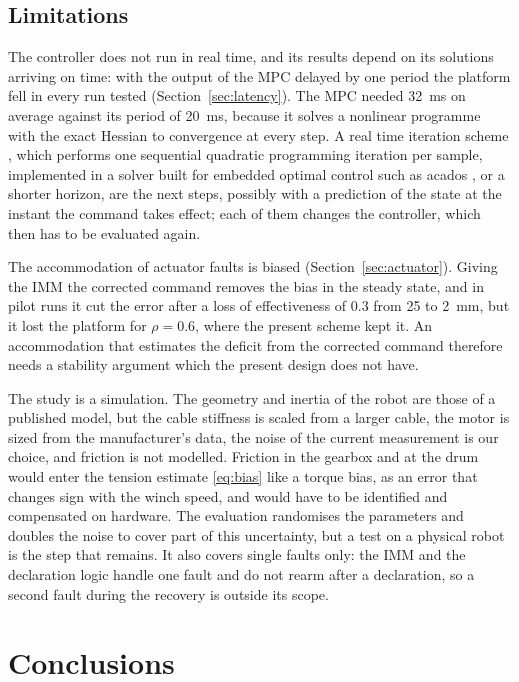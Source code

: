 \documentclass[a4paper,fleqn]{cas-dc}
\begin{document}
\subsection{Limitations}\label{sec:limits}

The controller does not run in real time, and its results depend on its solutions arriving on time: with the output of the MPC delayed by one period the platform fell in every run tested (Section~\ref{sec:latency}). The MPC needed 32~ms on average against its period of 20~ms, because it solves a nonlinear programme with the exact Hessian to convergence at every step. A real time iteration scheme \citep{diehl2005rti}, which performs one sequential quadratic programming iteration per sample, implemented in a solver built for embedded optimal control such as acados \citep{verschueren2022acados}, or a shorter horizon, are the next steps, possibly with a prediction of the state at the instant the command takes effect; each of them changes the controller, which then has to be evaluated again.

The accommodation of actuator faults is biased (Section~\ref{sec:actuator}). Giving the IMM the corrected command removes the bias in the steady state, and in pilot runs it cut the error after a loss of effectiveness of 0.3 from 25 to 2~mm, but it lost the platform for $\rho=0.6$, where the present scheme kept it. An accommodation that estimates the deficit from the corrected command therefore needs a stability argument which the present design does not have.

The study is a simulation. The geometry and inertia of the robot are those of a published model, but the cable stiffness is scaled from a larger cable, the motor is sized from the manufacturer's data, the noise of the current measurement is our choice, and friction is not modelled. Friction in the gearbox and at the drum would enter the tension estimate \eqref{eq:bias} like a torque bias, as an error that changes sign with the winch speed, and would have to be identified and compensated on hardware. The evaluation randomises the parameters and doubles the noise to cover part of this uncertainty, but a test on a physical robot is the step that remains. It also covers single faults only: the IMM and the declaration logic handle one fault and do not rearm after a declaration, so a second fault during the recovery is outside its scope.

\section{Conclusions}\label{sec:conclusions}
\end{document}
